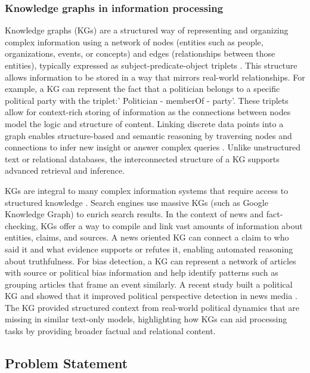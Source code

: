 \documentclass[11pt]{article}
\begin{document}
\subsubsection{Knowledge graphs in information processing}

Knowledge graphs (KGs) are a structured way of representing and organizing complex information using a network of nodes (entities such as people, organizations, events, or concepts) and edges (relationships between those entities), typically expressed as subject-predicate-object triplets \cite{r7}. This structure allows information to be stored in a way that mirrors real-world relationships. For example, a KG can represent the fact that a politician belongs to a specific political party with the triplet:' Politician - memberOf - party'. These triplets allow for context-rich storing of information as the connections between nodes model the logic and structure of content. Linking discrete data points into a graph enables structure-based and semantic reasoning by traversing nodes and connections to infer new insight or answer complex queries \cite{r8}. Unlike unstructured text or relational databases, the interconnected structure of a KG supports advanced retrieval and inference.

KGs are integral to many complex information systems that require access to structured knowledge \cite{r9}. Search engines use massive KGs (such as Google Knowledge Graph) to enrich search results. In the context of news and fact-checking, KGs offer a way to compile and link vast amounts of information about entities, claims, and sources. A news oriented KG can connect a claim to who said it and what evidence supports or refutes it, enabling automated reasoning about truthfulness\cite{r10}.
For bias detection, a KG can represent a network of articles with source or political bias information and help identify patterns such as grouping articles that frame an event similarly. A recent study built a political KG and showed that it improved political perspective detection in news media \cite{r11}. The KG provided structured context from real-world political dynamics that are missing in similar text-only models, highlighting how KGs can aid processing tasks by providing broader factual and relational content.

 





\subsection{Problem Statement}
\end{document}
